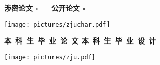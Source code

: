 \thispagestyle{empty}
\setcounter{page}{-1}

\begin{flushright}
    {\bfseries 涉密论文 $\square$ ~~ 公开论文 $\square$ }
\end{flushright}

\vskip 10mm

\begin{center}
    \texttt{[image: pictures/zjuchar.pdf]}
\end{center}

\begin{center}
     \heiti \bfseries
    {
        本~科~生~毕~业~论~文
    }
    {
        本~科~生~毕~业~设~计
    }
\end{center}

\vskip 20pt

\begin{center}
    \texttt{[image: pictures/zju.pdf]}
\end{center}

\vskip 20pt

{
    \newcommand{\CoverTitle}{
        题目      &  \uline{\hfill \Title{} \hfill} \\
        ~ & ~\\
    }
}
{
    \newcommand{\CoverTitle}{
        题目      &  \uline{\hfill \TitleLineOne{} \hfill} \\
        ~        & \uline{\hfill \TitleLineTwo{} \hfill} \\
    }
}

